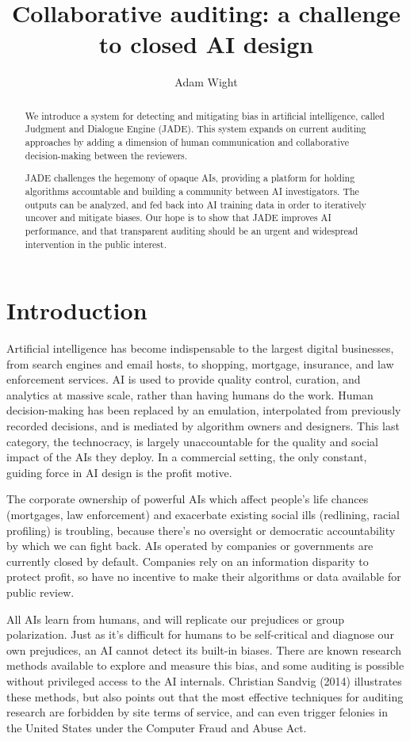 \documentclass[format=sigconf, authorversion]{acmart}
\title{Collaborative auditing: a challenge to closed AI design}
\author{Adam Wight}
\affiliation{Wikimedia Foundation}
\begin{document}
\begin{abstract}
We introduce a system for detecting and mitigating bias in artificial intelligence, called Judgment and Dialogue Engine (JADE).  This system expands on current auditing approaches by adding a dimension of human communication and collaborative decision-making between the reviewers.

JADE challenges the hegemony of opaque AIs, providing a platform for holding algorithms accountable and building a community between AI investigators.  The outputs can be analyzed, and fed back into AI training data in order to iteratively uncover and mitigate biases.  Our hope is to show that JADE improves AI performance, and that transparent auditing should be an urgent and widespread intervention in the public interest.
\end{abstract}

\maketitle

\section{Introduction}

Artificial intelligence has become indispensable to the largest digital businesses, from search engines and email hosts, to shopping, mortgage, insurance, and law enforcement services.  AI is used to provide quality control, curation, and analytics at massive scale, rather than having humans do the work.  Human decision-making has been replaced by an emulation, interpolated from previously recorded decisions, and is mediated by algorithm owners and designers.  This last category, the technocracy, is largely unaccountable for the quality and social impact of the AIs they deploy.  In a commercial setting, the only constant, guiding force in AI design is the profit motive.

The corporate ownership of powerful AIs which affect people's life chances (mortgages, law enforcement) and exacerbate existing social ills (redlining, racial profiling) is troubling, because there's no oversight or democratic accountability by which we can fight back.  AIs operated by companies or governments are currently closed by default.  Companies rely on an information disparity to protect profit, so have no incentive to make their algorithms or data available for public review.

All AIs learn from humans, and will replicate our prejudices or group polarization.  Just as it's difficult for humans to be self-critical and diagnose our own prejudices, an AI cannot detect its built-in biases.  There are known research methods available to explore and measure this bias, and some auditing is possible without privileged access to the AI internals.  Christian Sandvig (2014) illustrates these methods, but also points out that the most effective techniques for auditing research are forbidden by site terms of service, and can even trigger felonies in the United States under the Computer Fraud and Abuse Act.
\end{document}
